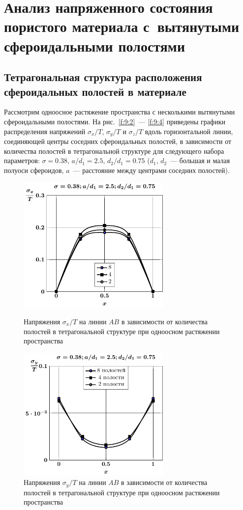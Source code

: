 \section{Анализ напряженного состояния пористого материала с~вытянутыми сфероидальными полостями}

\subsection{Тетрагональная структура расположения сфероидальных полостей в материале}

Рассмотрим одноосное растяжение пространства с несколькими вытянутыми сфероидальными полостями. На рис.~\ref{f:9:2}~--- \ref{f:9:4} приведены графики распределения напряжений $\sigma_x/T$, $\sigma_y/T$ и $\sigma_z/T$ вдоль горизонтальной  линии, соединяющей центры соседних сфероидальных полостей, в зависимости от количества полостей в тетрагональной структуре для следующего набора параметров: $\sigma=0.38$, $a/d_1=2.5$, $d_2/d_1=0.75$ ($d_1$, $d_2$~--- большая и малая полуоси сфероидов, $a$~--- расстояние между центрами соседних полостей).

\begin{figure}[h!]
\centering\footnotesize
\parbox[b]{7.5cm}{\centering\includegraphics[width=7.5cm]{cav8-4-2-sig_x-spheroids.pdf}
\caption{Напряжения $\sigma_x/T$ на линии $AB$ в зависимости от количества полостей в тетрагональной структуре при одноосном растяжении пространства
\label{f:9:2}}}\hfil\hfil
\parbox[b]{7.5cm}{\centering\includegraphics[width=7.5cm]{cav8-4-2-sig_y-spheroids.pdf}
\caption{Напряжения $\sigma_y/T$ на линии $AB$ в зависимости от количества полостей в тетрагональной структуре при одноосном растяжении пространства
\label{f:9:3}}}
\end{figure}

